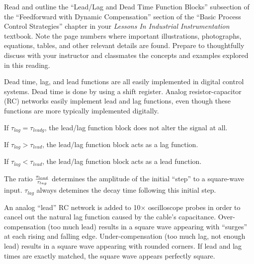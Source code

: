 

Read and outline the ``Lead/Lag and Dead Time Function Blocks'' subsection of the ``Feedforward with Dynamic Compensation'' section of the ``Basic Process Control Strategies'' chapter in your {\it Lessons In Industrial Instrumentation} textbook.  Note the page numbers where important illustrations, photographs, equations, tables, and other relevant details are found.  Prepare to thoughtfully discuss with your instructor and classmates the concepts and examples explored in this reading.














Dead time, lag, and lead functions are all easily implemented in digital control systems.  Dead time is done by using a shift register.  Analog resistor-capacitor (RC) networks easily implement lead and lag functions, even though these functions are more typically implemented digitally.

\vskip 10pt

If $\tau_{lag} = \tau_{leadg}$, the lead/lag function block does not alter the signal at all.

If $\tau_{lag} > \tau_{lead}$, the lead/lag function block acts as a lag function.

If $\tau_{lag} < \tau_{lead}$, the lead/lag function block acts as a lead function.

The ratio $\tau_{lead} \over \tau_{lag}$ determines the amplitude of the initial ``step'' to a square-wave input.  $\tau_{lag}$ always detemines the decay time following this initial step.

\vskip 10pt

An analog ``lead'' RC network is added to 10$\times$ oscilloscope probes in order to cancel out the natural lag function caused by the cable's capacitance.  Over-compensation (too much lead) results in a square wave appearing with ``surges'' at each rising and falling edge.  Under-compensation (too much lag, not enough lead) results in a square wave appearing with rounded corners.  If lead and lag times are exactly matched, the square wave appears perfectly square.






